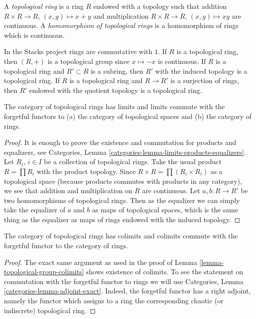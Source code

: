 \begin{definition}
\label{definition-topological-ring}
A {\it topological ring} is a ring $R$ endowed with a topology
such that addition $R \times R \to R$, $(x, y) \mapsto x + y$ and
multiplication $R \times R \to R$, $(x, y) \mapsto xy$ are continuous.
A {\it homomorphism of topological rings} is a homomorphism of rings
which is continuous.
\end{definition}

\noindent
In the Stacks project rings are commutative with $1$. If $R$
is a topological ring, then $(R, +)$ is a topological group
since $x \mapsto -x$ is continuous.
If $R$ is a topological ring and $R' \subset R$ is a subring,
then $R'$ with the induced topology is a topological ring.
If $R$ is a topological ring and $R \to R'$ is a surjection of
rings, then $R'$ endowed with the quotient topology is a topological
ring.

\begin{lemma}
\label{lemma-topological-ring-limits}
The category of topological rings has limits and limits commute
with the forgetful functors to (a) the category of topological spaces and
(b) the category of rings.
\end{lemma}

\begin{proof}
It is enough to prove the existence and commutation for products and
equalizers, see
Categories, Lemma \ref{categories-lemma-limits-products-equalizers}.
Let $R_i$, $i \in I$ be a collection of topological rings.
Take the usual product $R = \prod R_i$ with the product topology.
Since $R \times R = \prod (R_i \times R_i)$ as a topological space
(because products commutes with products in any category), we
see that addition and multiplication on $R$ are continuous. Let
$a, b : R \to R'$ be two homomorphisms of topological rings.
Then as the equalizer we can simply take the equalizer of $a$ and $b$
as maps of topological spaces, which is the same thing as the equalizer
as maps of rings endowed with the induced topology.
\end{proof}

\begin{lemma}
\label{lemma-topological-ring-colimits}
The category of topological rings has colimits and colimits commute
with the forgetful functor to the category of rings.
\end{lemma}

\begin{proof}
The exact same argument as used in the proof of
Lemma \ref{lemma-topological-group-colimits} shows existence of colimits.
To see the statement on commutation with the forgetful functor to
rings we will use Categories, Lemma \ref{categories-lemma-adjoint-exact}.
Indeed, the forgetful functor has a right adjoint, namely the functor which
assigns to a ring the corresponding chaotic (or indiscrete) topological ring.
\end{proof}

